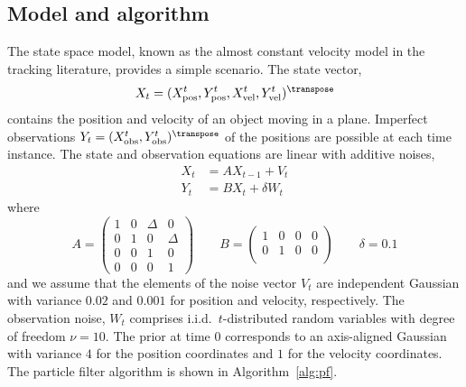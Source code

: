 \subsection{Model and algorithm}
\label{sub:Model and algorithm}

The state space model, known as the almost constant velocity model in the
tracking literature, provides a simple scenario. The state vector,
\begin{equation*}
  X_t = (\xpos^t, \ypos^t, \xvel^t, \yvel^t)^{\transpose}
\end{equation*}
contains the position and velocity of an object moving in a plane. Imperfect
observations $Y_t = (\xobs^t, \yobs^t)^{\transpose}$ of the positions are
possible at each time instance. The state and observation equations are linear
with additive noises,
\begin{align*}
  X_t &= AX_{t-1} + V_t \\
  Y_t &= BX_t + \delta W_t
\end{align*}
where
\begin{equation*}
  A = \begin{pmatrix}
    1 & 0 & \Delta & 0      \\
    0 & 1 & 0      & \Delta \\
    0 & 0 & 1      & 0      \\
    0 & 0 & 0      & 1
  \end{pmatrix} \qquad
  B = \begin{pmatrix}
    1 & 0 & 0 & 0 \\
    0 & 1 & 0 & 0 \\
  \end{pmatrix} \qquad
  \delta = 0.1
\end{equation*}
and we assume that the elements of the noise vector $V_t$ are independent
Gaussian with variance $0.02$ and $0.001$ for position and velocity,
respectively. The observation noise, $W_t$ comprises i.i.d.\ $t$-distributed
random variables with degree of freedom $\nu = 10$. The prior at time $0$
corresponds to an axis-aligned Gaussian with variance $4$ for the position
coordinates and $1$ for the velocity coordinates. The particle filter algorithm
is shown in Algorithm~\ref{alg:pf}.

